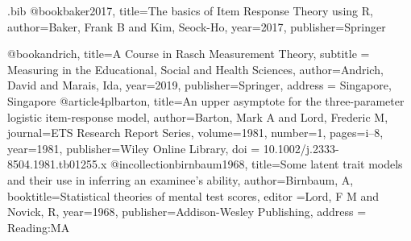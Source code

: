 \RequirePackage{filecontents}
\begin{filecontents*}{\jobname.bib}
  @book{baker2017,
  title={{The basics of Item Response Theory using R}},
  author={Baker, Frank B and Kim, Seock-Ho},
  year={2017},
  publisher={Springer}
}

@book{andrich,
  title={{A Course in Rasch Measurement Theory}},
  subtitle = {{Measuring in the Educational, Social and Health Sciences}},
  author={Andrich, David and Marais, Ida},
  year={2019},
  publisher={Springer},
  address = {Singapore, Singapore}
}
@article{4plbarton,
  title={An upper asymptote for the three-parameter logistic item-response model},
  author={Barton, Mark A and Lord, Frederic M},
  journal={ETS Research Report Series},
  volume={1981},
  number={1},
  pages={i--8},
  year={1981},
  publisher={Wiley Online Library},
  doi = {10.1002/j.2333-8504.1981.tb01255.x}
}
@incollection{birnbaum1968,
  title={Some latent trait models and their use in inferring an examinee's ability},
  author={Birnbaum, A},
  booktitle={Statistical theories of mental test scores},
  editor ={Lord, F M and Novick, R},
  year={1968},
  publisher={Addison-Wesley Publishing},
  address = {Reading:MA}
}



\end{filecontents*}
